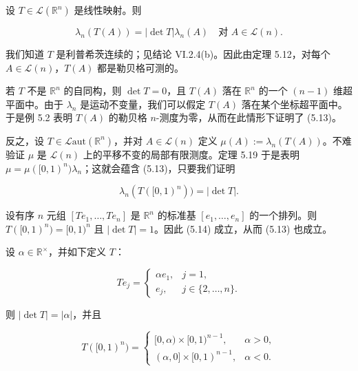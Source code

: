 \begin{theorem}

设 $ T \in \mathcal{L}(\mathbb{R}^n) $ 是线性映射。则

\begin{equation}
\lambda_n(T(A)) = |\det T| \lambda_n(A) \quad \text{对 } A \in \mathcal{L}(n) .\tag{5.13}
\end{equation}

\proofhead
我们知道 $ T $ 是利普希茨连续的；见结论 VI.2.4(b)。因此由定理 5.12，对每个 $ A \in \mathcal{L}(n) $，$ T(A) $ 都是勒贝格可测的。

\begin{subitems}
\item

若 $ T $ 不是 $ \mathbb{R}^n $ 的自同构，则 $ \det T = 0 $，且 $ T(A) $ 落在 $ \mathbb{R}^n $ 的一个 $ (n-1) $ 维超平面中。由于 $ \lambda_n $ 是运动不变量，我们可以假定 $ T(A) $ 落在某个坐标超平面中。于是例 5.2 表明 $ T(A) $ 的勒贝格 $ n $-测度为零，从而在此情形下证明了 (5.13)。

\item

反之，设 $ T \in \mathcal{L}\mathrm{aut}(\mathbb{R}^n) $，并对 $ A \in \mathcal{L}(n) $ 定义 $ \mu(A) := \lambda_n(T(A)) $。不难验证 $ \mu $ 是 $ \mathcal{L}(n) $ 上的平移不变的局部有限测度。定理 5.19 于是表明 $ \mu = \mu([0, 1)^n) \lambda_n $；这就会蕴含 (5.13)，只要我们证明

\begin{equation}
\lambda_n(T([0, 1)^n)) = |\det T| .\tag{5.14}
\end{equation}
\item

设有序 $ n $ 元组 $ [Te_1, \ldots, Te_n] $ 是 $ \mathbb{R}^n $ 的标准基 $ [e_1, \ldots, e_n] $ 的一个排列。则 $ T([0, 1)^n) = [0, 1)^n $ 且 $ |\det T| = 1 $。因此 (5.14) 成立，从而 (5.13) 也成立。

\item

设 $ \alpha \in \mathbb{R}^{\times} $，并如下定义 $ T $：

\begin{equation*}
Te_j = \begin{cases} \alpha e_1 , & j = 1 , \\ e_j , & j \in \{2, \ldots, n\} . \end{cases}
\end{equation*}

则 $ |\det T| = |\alpha| $，并且

\begin{equation*}
T([0, 1)^n) = \begin{cases} [0, \alpha) \times [0, 1)^{n-1} , & \alpha > 0 , \\ (\alpha, 0] \times [0, 1)^{n-1} , & \alpha < 0 . \end{cases}
\end{equation*}


\end{subitems}
\end{theorem}
